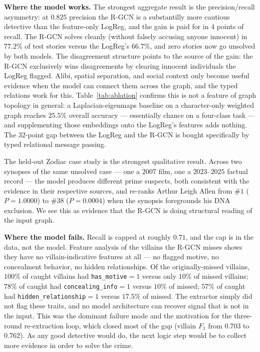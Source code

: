 \documentclass[11pt]{article}
\theoremstyle{definition}
\begin{document}
\textbf{Where the model works.} The strongest aggregate result is the precision/recall asymmetry: at $0.825$ precision the R-GCN is a substantilly more cautious detective than the feature-only LogReg, and the gain is paid for in $4$ points of recall. The R-GCN solves cleanly (without falsely accusing anyone innocent) in $77.2\%$ of test stories versus the LogReg's $66.7\%$, and zero stories now go unsolved by both models. The disagreement structure points to the source of the gain: the R-GCN exclusively wins disagreements by clearing innocent individuals the LogReg flagged. Alibi, spatial separation, and social context only become useful evidence when the model can connect them across the graph, and the typed relations work for this. Table~\ref{tab:ablation} confirms this is not a feature of graph topology in general: a Laplacian-eigenmaps baseline on a character-only weighted graph reaches $25.5\%$ overall accuracy --- essentially chance on a four-class task --- and supplementing those embeddings onto the LogReg's features adds nothing. The $32$-point gap between the LogReg and the R-GCN is bought specifically by typed relational message passing.

The held-out Zodiac case study is the strongest qualitative result. Across two synopses of the same unsolved case --- one a $2007$ film, one a $2023$--$2025$ factual record --- the model produces different prime suspects, both consistent with the evidence in their respective sources, and re-ranks Arthur Leigh Allen from \#$1$ ($P=1.0000$) to \#$38$ ($P=0.0004$) when the synopsis foregrounds his DNA exclusion. We see this as evidence that the R-GCN is doing structural reading of the input graph. 

\textbf{Where the model fails.} Recall is capped at roughly $0.71$, and the cap is in the data, not the model. Feature analysis of the villains the R-GCN misses shows they have no villain-indicative features at all --- no flagged motive, no concealment behavior, no hidden relationships. Of the originally-missed villains, $100\%$ of caught villains had \texttt{has\_motive}$=1$ versus only $10\%$ of missed villains; $78\%$ of caught had \texttt{concealing\_info}$=1$ versus $10\%$ of missed; $57\%$ of caught had \texttt{hidden\_relationship}$=1$ versus $17.5\%$ of missed. The extractor simply did not flag these traits, and no model architecture can recover signal that is not in the input. This was the dominant failure mode and the motivation for the three-round re-extraction loop, which closed most of the gap (villain $F_1$ from $0.703$ to $0.762$). As any good detective would do, the next logic step would be to collect more evidence in order to solve the crime.
\end{document}
